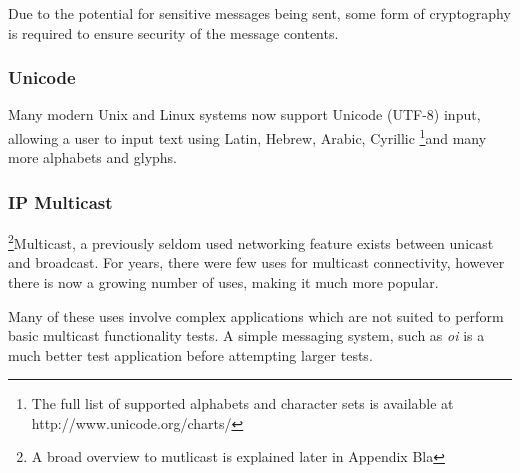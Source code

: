 Due to the potential for sensitive messages being sent, some form of
cryptography is required to ensure security of the message contents.

\subsubsection{Unicode}

Many modern Unix and Linux systems now support Unicode (UTF-8) input,
allowing a user to input text using Latin, Hebrew, Arabic, Cyrillic
\footnote{The full list of supported alphabets and character sets is
available at http://www.unicode.org/charts/}{and many more}
alphabets and glyphs. 

\subsubsection{IP Multicast}

\footnote{A broad overview to mutlicast is explained later in Appendix
Bla}{Multicast}, a previously seldom used networking feature exists 
between unicast and broadcast. For years, there were few uses for
multicast connectivity, however there is now a growing number of uses,
making it much more popular. 


Many of these uses involve complex applications which are not suited to
perform basic multicast functionality tests. A simple messaging system,
such as \emph{oi} is a much better test application before attempting 
larger tests.
